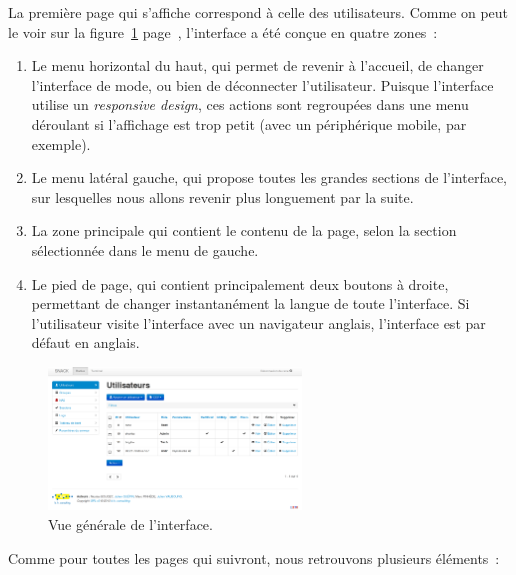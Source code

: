 La première page qui s'affiche correspond à celle des utilisateurs. Comme on peut le voir sur la figure~\ref{general} page~\pageref{general}, l'interface a été conçue en quatre zones~:

\begin{enumerate}
\item Le menu horizontal du haut, qui permet de revenir à l'accueil, de changer l'interface de mode, ou bien de déconnecter l'utilisateur. Puisque l'interface utilise un \emph{responsive design}, ces actions sont regroupées dans une menu déroulant si l'affichage est trop petit (avec un périphérique mobile, par exemple).
\item Le menu latéral gauche, qui propose toutes les grandes sections de l'interface, sur lesquelles nous allons revenir plus longuement par la suite.
\item La zone principale qui contient le contenu de la page, selon la section sélectionnée dans le menu de gauche.
\item Le pied de page, qui contient principalement deux boutons à droite, permettant de changer instantanément la langue de toute l'interface. Si l'utilisateur visite l'interface avec un navigateur anglais, l'interface est par défaut en anglais.
\end{enumerate}

\begin{figure}[!h]
	\begin{center}
	    \includegraphics[width=0.6\textwidth]{img/general.png}
	\end{center}
	\caption{Vue générale de l'interface.}
	\label{general}
\end{figure}

Comme pour toutes les pages qui suivront, nous retrouvons plusieurs éléments~:

